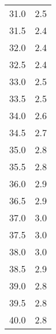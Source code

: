 \begin{table}
\begin{tabular}{S[]S[]}
31.0 & 2.5\\
31.5 & 2.4\\
32.0 & 2.4\\
32.5 & 2.4\\
33.0 & 2.5\\
33.5 & 2.5\\
34.0 & 2.6\\
34.5 & 2.7\\
35.0 & 2.8\\
35.5 & 2.8\\
36.0 & 2.9\\
36.5 & 2.9\\
37.0 & 3.0\\
37.5 & 3.0\\
38.0 & 3.0\\
38.5 & 2.9\\
39.0 & 2.8\\
39.5 & 2.8\\
40.0 & 2.8\\
\bottomrule
\end{tabular}\end{table}